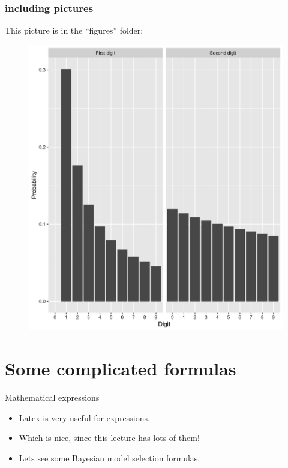 
\begin{frame}
	\frametitle{including pictures}

This picture is in the ``figures'' folder:

\begin{figure}
\includegraphics[scale=.075]{figures/benford.png}
\end{figure}

\end{frame}

\section{Some complicated formulas}


\begin{frame}{Mathematical expressions}

\begin{itemize}
\item Latex is very useful for  expressions.
\item Which is nice, since this lecture has lots of them!
\item Lets see some Bayesian model selection formulas.
\end{itemize}

\end{frame}


